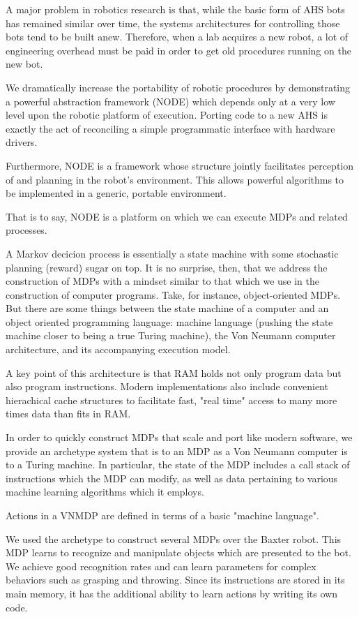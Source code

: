 \documentclass[conference]{IEEEtran}
\begin{document}
A major problem in robotics research is that, while the basic form of AHS bots has remained
similar over time, the systems architectures for controlling those bots tend to be built 
anew. Therefore, when a lab acquires a new robot, a lot of engineering overhead must be paid
in order to get old procedures running on the new bot.

We dramatically increase the portability of robotic procedures by demonstrating a powerful
abstraction framework (NODE) which depends only at a very low level upon the robotic platform
of execution. Porting code to a new AHS is exactly the act of reconciling a simple programmatic
interface with hardware drivers.

Furthermore, NODE is a framework whose structure jointly facilitates perception of 
and planning in the robot's environment. This allows powerful algorithms to be implemented in a
generic, portable environment.

That is to say, NODE is a platform on which we can execute MDPs and related processes.

A Markov decicion process is essentially a state machine with some stochastic planning (reward)
sugar on top. It is no surprise, then, that we address the construction of MDPs with a mindset similar
to that which we use in the construction of computer programs. Take, for instance, object-oriented MDPs. But there
are some things between the state machine of a computer and an object oriented programming language:
machine language (pushing the state machine closer to being a true Turing machine), the Von Neumann computer 
architecture, and its accompanying execution model.

A key point of this architecture is that RAM holds not only program data but also program instructions.
Modern implementations also include convenient hierachical cache structures to facilitate fast,
"real time" access to many more times data than fits in RAM.

In order to quickly construct MDPs that scale and port like modern software, we provide an
archetype system that is to an MDP as a Von Neumann computer is to a Turing machine.
In particular, the state of the MDP includes a call stack of instructions which the MDP
can modify, as well as data pertaining to various machine learning algorithms which it employs.

Actions in a VNMDP are defined in terms of a basic "machine language".

We used the archetype to construct several MDPs over the Baxter robot. This MDP learns to recognize and manipulate
objects which are presented to the bot. We achieve good recognition rates and can learn parameters 
for complex behaviors such as grasping and throwing. Since its instructions are stored in its main memory, 
it has the additional ability to learn actions by writing its own code.
\end{document}
